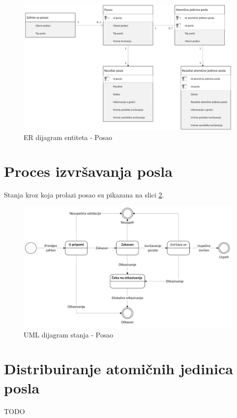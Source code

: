 \documentclass[12pt,oneside]{memoir}
\begin{document}
\begin{figure}[!ht]
  \centering
  \label{fig:erposao}
  \includegraphics[width=1.0\textwidth]{./images/uml_er_dijagram_posao.png}
  \caption{ER dijagram entiteta - Posao}
\end{figure}



\section{Proces izvršavanja posla}
Stanja kroz koja prolazi posao su pikazana na slici \ref{fig:stanjaposla}.

\begin{figure}[!ht]
  \centering
  \label{fig:stanjaposla}
  \includegraphics[width=1.0\textwidth]{./images/dijagram_stanja_posao.png}
  \caption{UML dijagram stanja - Posao}
\end{figure}


\section{Distribuiranje atomičnih jedinica posla}
TODO
\end{document}
